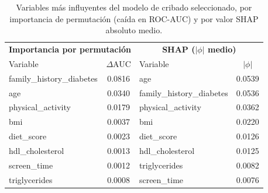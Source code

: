 \begin{table}[!t]
\renewcommand{\arraystretch}{1.2}
\caption{Variables más influyentes del modelo de cribado seleccionado, por
importancia de permutación (caída en ROC-AUC) y por valor SHAP absoluto medio.}
\label{tab:importance}
\centering
\begin{tabular}{l c | l c}
\toprule
\multicolumn{2}{c|}{\textbf{Importancia por permutación}} & \multicolumn{2}{c}{\textbf{SHAP (\(|\phi|\) medio)}} \\
Variable & $\Delta$AUC & Variable & $|\phi|$ \\
\midrule
family\_history\_diabetes & 0.0816 & age & 0.0539 \\
age & 0.0340 & family\_history\_diabetes & 0.0536 \\
physical\_activity & 0.0179 & physical\_activity & 0.0362 \\
bmi & 0.0037 & bmi & 0.0220 \\
diet\_score & 0.0023 & diet\_score & 0.0126 \\
hdl\_cholesterol & 0.0013 & hdl\_cholesterol & 0.0125 \\
screen\_time & 0.0012 & triglycerides & 0.0082 \\
triglycerides & 0.0008 & screen\_time & 0.0076 \\
\bottomrule
\end{tabular}
\end{table}
